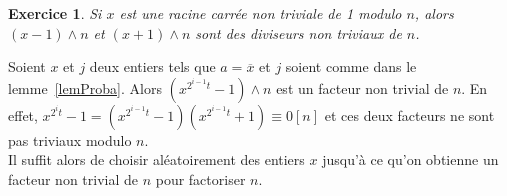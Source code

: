 \documentclass[12pt]{report}
\newtheorem*{exo}{Exercice}
\begin{document}
\begin{exo}
Si $x$ est une racine carrée non triviale de 1 modulo $n$, alors $(x-1)\wedge n$ et $(x+1)\wedge n$ sont des diviseurs non triviaux de $n$.
\end{exo}


Soient $x$ et $j$ deux entiers tels que $a=\overline{x}$ et $j$ soient comme dans le lemme~\ref{lemProba}. Alors $(x^{2^{i-1}t}-1)\wedge n$ est un facteur non trivial de $n$. En effet, $ x^{2^i t}-1 =(x^{2^{i-1}t}-1)(x^{2^{i-1}t}+1) \equiv 0 [n]  $ et ces deux facteurs ne sont pas triviaux modulo $n$.\\
Il suffit alors de choisir aléatoirement des entiers $x$ jusqu'à ce qu'on obtienne un facteur non trivial de $n$ pour factoriser $n$.

\bigskip
\begin{comment}
\begin{tabular}{p{6cm}|p{6cm}}
{Choix de $n$, $p$ et $q$}  & Attaques à contrer \\
\hline 
$n$ grand & factorisation de $n$ \\
\hline
$p$ et $q$ de taille semblable  & algorithme de factorisation des courbes elliptiques \\
\hline
$p$ et $q$ assez grands ($|p-q|> \sqrt[4]{n} $) & essai d'entiers impairs proches de $\sqrt{n}$. \\
\hline
$p$ et $q$ forts

$p$ fort signifie:

$p-1$ a un grand facteur premier: r

$p+1$ a un grand facteur premier

$r-1$ a un grand facteur premier

 & \
 
 \
 
 algorithme de factorisation $p-1$
 
 algorithme de factorisation $p+1$
 
  algorithme de factorisation $r-1$ 
 
 
 \\

\end{tabular}
\end{comment}
\end{document}
